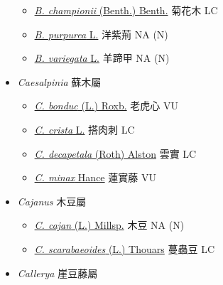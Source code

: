 \begin{itemize}
  \begin{itemize}
        \item[] \href{http://www.theplantlist.org/tpl1.1/search?q=Bauhinia+championii}{\textit{B. championii} (Benth.) Benth.}   菊花木   LC
        \item[] \href{http://www.theplantlist.org/tpl1.1/search?q=Bauhinia+purpurea}{\textit{B. purpurea} L.}   洋紫荊   NA (N)
        \item[] \href{http://www.theplantlist.org/tpl1.1/search?q=Bauhinia+variegata}{\textit{B. variegata} L.}   羊蹄甲   NA (N)
  \end{itemize}
 \item[] \textit{Caesalpinia} 蘇木屬
                                
  \begin{itemize}
        \item[] \href{http://www.theplantlist.org/tpl1.1/search?q=Caesalpinia+bonduc}{\textit{C. bonduc} (L.) Roxb.}   老虎心   VU
        \item[] \href{http://www.theplantlist.org/tpl1.1/search?q=Caesalpinia+crista}{\textit{C. crista} L.}   搭肉刺   LC
        \item[] \href{http://www.theplantlist.org/tpl1.1/search?q=Caesalpinia+decapetala}{\textit{C. decapetala} (Roth) Alston}   雲實   LC
        \item[] \href{http://www.theplantlist.org/tpl1.1/search?q=Caesalpinia+minax}{\textit{C. minax} Hance}   蓮實藤   VU
  \end{itemize}
 \item[] \textit{Cajanus} 木豆屬
                                
  \begin{itemize}
        \item[] \href{http://www.theplantlist.org/tpl1.1/search?q=Cajanus+cajan}{\textit{C. cajan} (L.) Millsp.}   木豆   NA (N)
        \item[] \href{http://www.theplantlist.org/tpl1.1/search?q=Cajanus+scarabaeoides}{\textit{C. scarabaeoides} (L.) Thouars}   蔓蟲豆   LC
  \end{itemize}
 \item[] \textit{Callerya} 崖豆藤屬
                                

\end{itemize}
